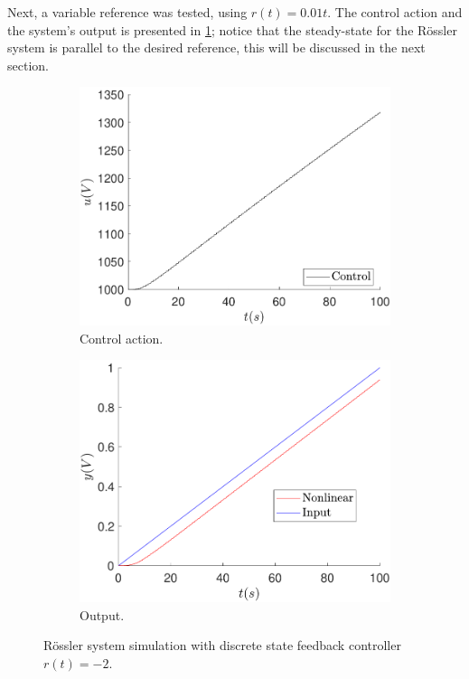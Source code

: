 	Next, a variable reference was tested, using $r(t)=0.01t$. The control action and the system's output is presented in \ref{fig:feedback_u_ramp_0_01}; notice that the steady-state for the Rössler system is parallel to the desired reference, this will be discussed in the next section.
	
	\begin{figure}
        \centering
        \begin{subfigure}[b]{0.475\textwidth}
            \centering
            \includegraphics[scale=0.425]{files/feedback/Ref!0/control_sfc_ramp_0_01_ref_dif_0.pdf}
            \caption{Control action.}
        \end{subfigure}
        \vskip0.1cm
        \begin{subfigure}[b]{0.475\textwidth}   
            \centering 
            \includegraphics[scale=0.425]{files/feedback/Ref!0/sfc_ramp_0_01_ref_dif_0.pdf}
            \caption{Output.}
        \end{subfigure}
        \caption{Rössler system simulation with discrete state feedback controller $r(t)=-2$.}
        \label{fig:feedback_u_ramp_0_01}
	\end{figure}
	
